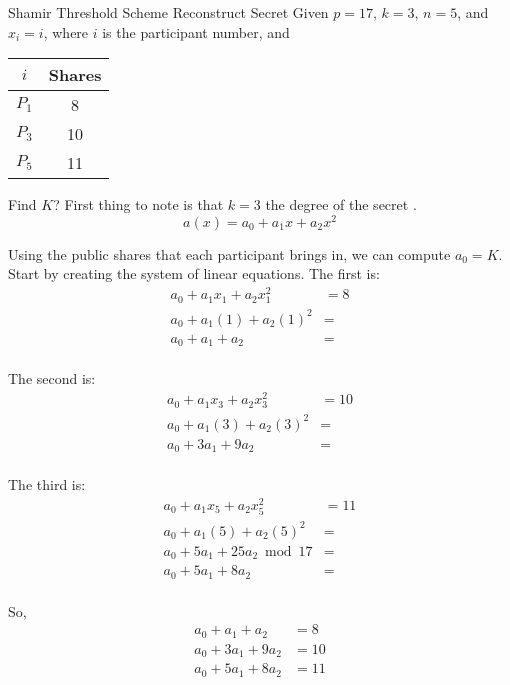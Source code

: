 \begin{example}{Shamir Threshold Scheme Reconstruct Secret}
  Given $p=17$, $k=3$, $n=5$, and $x_{i} = i$, where $i$ is the participant number, and
  \begin{center}
    \begin{tabular}{c|c}
      \toprule
      $i$ & Shares \\
      \midrule
      $P_{1}$ & 8 \\
      $P_{3}$ & 10 \\
      $P_{5}$ & 11 \\
      \bottomrule
    \end{tabular}
  \end{center}

  Find $K$?
  \tcblower{}
  First thing to note is that $k=3$ the degree of the secret .
  \begin{equation*}
    a(x) = a_{0} + a_{1}x + a_{2}x^{2}
  \end{equation*}

  Using the public shares that each participant brings in, we can compute $a_{0} = K$.
  Start by creating the system of linear equations.
  The first is:
  \begin{align*}
    a_{0} + a_{1}x_{1} + a_{2}x_{1}^{2} &= 8 \\
    a_{0} + a_{1}(1) + a_{2}{(1)}^{2} &= \\
    a_{0} + a_{1} + a_{2} &= \\
  \end{align*}

  The second is:
  \begin{align*}
    a_{0} + a_{1}x_{3} + a_{2}x_{3}^{2} &= 10 \\
    a_{0} + a_{1}(3) + a_{2}{(3)}^{2} &= \\
    a_{0} + 3a_{1} + 9a_{2} &= \\
  \end{align*}

  The third is:
  \begin{align*}
    a_{0} + a_{1}x_{5} + a_{2}x_{5}^{2} &= 11 \\
    a_{0} + a_{1}(5) + a_{2}{(5)}^{2} &= \\
    a_{0} + 5a_{1} + 25a_{2} \bmod 17 &= \\
    a_{0} + 5a_{1} + 8a_{2} &= \\
  \end{align*}

  So,
  \begin{align*}
    a_{0} + a_{1} + a_{2} &= 8 \\
    a_{0} + 3a_{1} + 9a_{2} &= 10 \\
    a_{0} + 5a_{1} + 8a_{2} &= 11 \\
  \end{align*}


\end{example}
